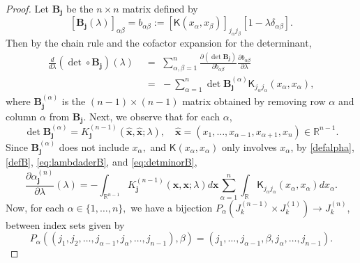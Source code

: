 \documentclass{birkjour}
\theoremstyle{definition}
\theoremstyle{remark}
\numberwithin{equation}{section}
\begin{document}
\begin{proof}
 Let  $\mathbf{B}_{\mathbf{j}}$ be  the  $n \times n$ matrix defined by
 \begin{equation}\label{defB}
     [\mathbf{B}_{\mathbf{j}}(\lambda)]_{\alpha \beta} = 
     b_{\alpha\beta} := [\textsf{K}(x_{\alpha}, x_{\beta})]_{j_{\alpha} j_{\beta}}[1 - \lambda \delta_{\alpha \beta}].     
     \end{equation}
 Then by  the chain rule and the cofactor expansion for the determinant, 
 \begin{align}
     \frac{d}{d\lambda}({\det} \circ  \mathbf{B}_{\mathbf{j}})(\lambda) 
     &\,\,=\,\, \sum_{\alpha,\beta=1}^{n} \frac{\partial(\det \mathbf{B}_{\mathbf{j}})}{\partial b_{\alpha \beta}} \frac{\partial b_{\alpha \beta}}{\partial \lambda}
     \nonumber
     \\
&\,\,=\,\,     
       -\sum_{\alpha=1}^n \det\mathbf{B}_{\mathbf{j}}^{(\alpha)}\textsf{K}_{j_{\alpha}j_{\alpha}}(x_{\alpha},x_{\alpha}),
       \label{eq:lambdaderB}
 \end{align}
where $\mathbf{B}_{\mathbf{j}}^{(\alpha)}$ 
is the $(n-1) \times (n-1)$ matrix obtained by removing row $\alpha$ and column $\alpha$ from $\mathbf{B}_{\mathbf{j}}$. 
Next, we observe that for each $\alpha$, 
\begin{equation}\label{eq:detminorB}
\det \mathbf{B}_{\mathbf{j}}^{(\alpha)}
= K_{\mathbf{j}}^{(n-1)}(\mathbf{\widehat{x}}, \mathbf{\widehat{x}}; \lambda),
\quad\widehat{\mathbf x} = (x_1,\dots, x_{\alpha-1}, x_{\alpha+1}, x_n)\in \mathbb R^{n-1}.
\end{equation}
Since $\mathbf{B}_{\mathbf{j}}^{(\alpha)}$ does not include $x_{\alpha},$ and $\textsf{K}(x_{\alpha}, x_{\alpha})$ only involves $x_{\alpha}$, 
by \eqref{defalpha}, \eqref{defB}, \eqref{eq:lambdaderB}, and \eqref{eq:detminorB},
\begin{equation}\label{eq:finaldet2thmproof2} 
 \frac{\partial \alpha^{(n)}_{\mathbf{j}}}{\partial \lambda}(\lambda) = - \int_{\mathbb{R}^{n-1}} K_{\mathbf{j}}^{(n-1)}(\mathbf{x}, \mathbf{x}; \lambda) d\mathbf{x} \sum_{\alpha=1}^n \int_{\mathbb R}\textsf{K}_{j_{\alpha}j_{\alpha}}(x_\alpha,x_\alpha) dx_{\alpha}.
\end{equation}
Now, for   each $\alpha \in \{1, \dots, n\}, $ 
we have a bijection 
   $ P_{\alpha} \left(J^{(n-1)}_k \times J^{(1)}_k\right) \rightarrow J^{(n)}_k$,
between index sets given by
\begin{equation}
P_\alpha\left((j_1, j_2, \dots, j_{\alpha - 1}, j_{\alpha}, \dots, j_{n-1}), \beta \right) = (j_1, \dots, j_{\alpha - 1}, \beta, j_{\alpha}, \dots, j_{n-1}).
\end{equation}


\end{proof}
\end{document}
